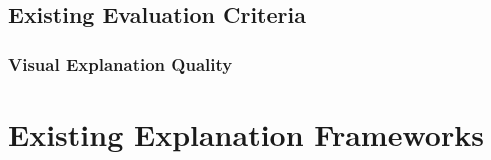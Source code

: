 \documentclass[main]{subfiles}
\begin{document}

\subsection{Existing Evaluation Criteria}

\subsubsection{Visual Explanation Quality}













\section{Existing Explanation Frameworks}







\end{document}
